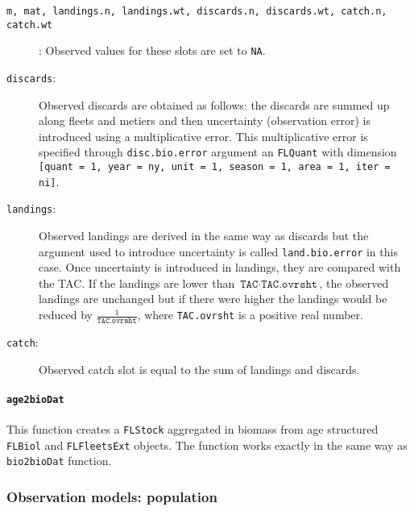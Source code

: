 \begin{description}
	\item[\texttt{m, mat, landings.n, landings.wt, discards.n, discards.wt, catch.n, catch.wt}] : Observed values for these slots are set to \texttt{NA}.
	\item[\texttt{discards}:] Observed discards are obtained as follows: the discards are summed up along fleets and metiers and then uncertainty	(observation error) is introduced using a multiplicative error. This multiplicative error is specified through \texttt{disc.bio.error} argument an \texttt{FLQuant} with dimension \texttt{[quant = 1, year = ny, unit = 1, season = 1, area = 1, iter = ni]}. 
	\item[\texttt{landings}:] Observed landings are derived in the same way as discards but the argument used to introduce uncertainty is called \texttt{land.bio.error} in this case. 
	  Once uncertainty is introduced in landings, they are compared with the TAC. If the landings are lower than $\texttt{TAC}\cdot\texttt{TAC.ovrsht}$, the observed landings are unchanged but if there were higher the landings would be reduced by $\frac{1}{\texttt{TAC.ovrsht}}$, where \texttt{TAC.ovrsht} is a positive real number.
	\item[\texttt{catch}:] Observed catch slot is equal to the sum of landings and discards.
\end{description}


\paragraph{\texttt{age2bioDat}} \hspace{0pt} \smallskip
	 This function creates a \texttt{FLStock} aggregated in biomass from
	 age structured \texttt{FLBiol} and \texttt{FLFleetsExt} objects. 
	 The function works exactly in the same way as \texttt{bio2bioDat} function.





\subsubsection{Observation models: population}

